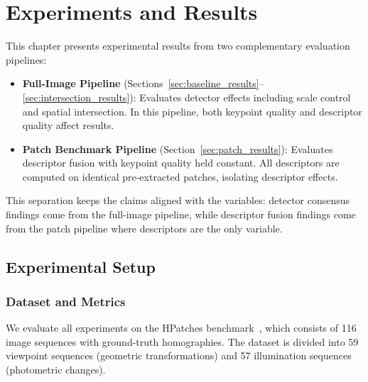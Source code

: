 
\chapter{Experiments and Results}%
\label{chap:results}

This chapter presents experimental results from two complementary evaluation pipelines:

\begin{itemize}
    \item \textbf{Full-Image Pipeline} (Sections~\ref{sec:baseline_results}--\ref{sec:intersection_results}): Evaluates detector effects including scale control and spatial intersection. In this pipeline, both keypoint quality and descriptor quality affect results.

    \item \textbf{Patch Benchmark Pipeline} (Section~\ref{sec:patch_results}): Evaluates descriptor fusion with keypoint quality held constant. All descriptors are computed on identical pre-extracted patches, isolating descriptor effects.
\end{itemize}

This separation keeps the claims aligned with the variables: detector consensus findings come from the full-image pipeline, while descriptor fusion findings come from the patch pipeline where descriptors are the only variable.

\section{Experimental Setup}
\label{sec:experimental_setup}

\subsection{Dataset and Metrics}

We evaluate all experiments on the HPatches benchmark~\cite{balntas2017hpatches}, which consists of 116 image sequences with ground-truth homographies. The dataset is divided into 59 viewpoint sequences (geometric transformations) and 57 illumination sequences (photometric changes).

